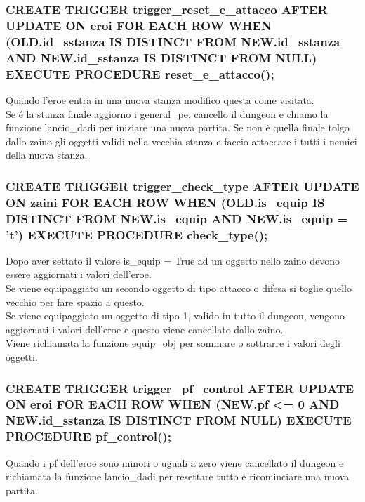 \documentclass[11pt]{article}
\begin{document}
\subsubsection{CREATE TRIGGER trigger\_reset\_e\_attacco AFTER UPDATE ON eroi FOR EACH ROW WHEN (OLD.id\_sstanza IS DISTINCT FROM NEW.id\_sstanza AND NEW.id\_sstanza IS DISTINCT FROM NULL) EXECUTE PROCEDURE reset\_e\_attacco();}
Quando l'eroe entra in una nuova stanza modifico questa come visitata.\\
Se é la stanza finale aggiorno i general\_pe, cancello il dungeon e chiamo la funzione lancio\_dadi per iniziare una nuova partita.
Se non è quella finale tolgo dallo zaino gli oggetti validi nella vecchia stanza e faccio attaccare i tutti i nemici della nuova stanza.
\subsubsection{CREATE TRIGGER trigger\_check\_type AFTER UPDATE ON zaini FOR EACH ROW WHEN (OLD.is\_equip IS DISTINCT FROM NEW.is\_equip AND NEW.is\_equip = 't') EXECUTE PROCEDURE check\_type();}
Dopo aver settato il valore is\_equip = True ad un oggetto nello zaino devono essere aggiornati i valori dell'eroe.\\
Se viene equipaggiato un secondo oggetto di tipo attacco o difesa si toglie quello vecchio per fare spazio a questo.\\
Se viene equipaggiato un oggetto di tipo 1, valido in tutto il dungeon, vengono aggiornati i valori dell'eroe e questo viene cancellato dallo zaino.\\
Viene richiamata la funzione equip\_obj per sommare o sottrarre i valori degli oggetti.
\subsubsection{CREATE TRIGGER trigger\_pf\_control AFTER UPDATE ON eroi FOR EACH ROW WHEN (NEW.pf \textless = 0 AND NEW.id\_sstanza IS DISTINCT FROM NULL) EXECUTE PROCEDURE pf\_control();}
Quando i pf dell'eroe sono minori o uguali a zero viene cancellato il dungeon e richiamata la funzione lancio\_dadi per resettare tutto e ricominciare una nuova partita.
\end{document}
